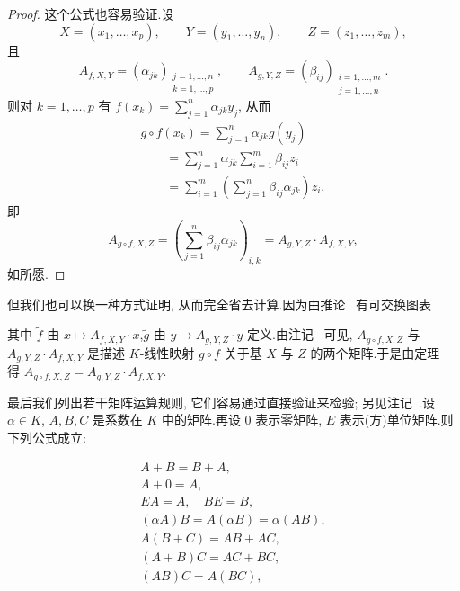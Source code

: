 \begin{proof}
这个公式也容易验证.设
\[
X = (x_1, \ldots, x_p), \qquad Y = (y_1, \ldots, y_n), \qquad Z = (z_1, \ldots, z_m),
\]
且
\[
A_{f, X, Y} = (\alpha_{jk})_{\substack{j = 1, \ldots, n\\ k = 1, \ldots, p}}, \qquad
A_{g, Y, Z} = (\beta_{ij})_{\substack{i = 1, \ldots, m\\ j = 1, \ldots, n}}\text{.}
\]
则对 $k = 1, \ldots, p$ 有 $f(x_k) = \sum_{j = 1}^{n}\alpha_{jk}y_j$, 从而
\[
\begin{array}{l}
g \circ f(x_k) = \sum_{j = 1}^{n}\alpha_{jk}g(y_j) \\
\qquad = \sum_{j = 1}^{n}\alpha_{jk}\sum_{i = 1}^{m}\beta_{ij}z_i \\
\qquad = \sum_{i = 1}^{m}\left(\sum_{j = 1}^{n}\beta_{ij}\alpha_{jk}\right)z_i,
\end{array}
\]
即
\[
A_{g \circ f, X, Z} = \left(\sum_{j = 1}^{n}\beta_{ij}\alpha_{jk}\right)_{i, k} = A_{g, Y, Z} \cdot A_{f, X, Y},
\]
如所愿.
\end{proof}

但我们也可以换一种方式证明, 从而完全省去计算.因为由推论~ 有可交换图表

\begin{center}
\end{center}

其中 $\tilde{f}$ 由 $x \longmapsto A_{f, X, Y} \cdot x$,$\tilde{g}$ 由 $y \longmapsto A_{g, Y, Z} \cdot y$ 定义.由注记~ 可见, $A_{g \circ f, X, Z}$ 与 $A_{g, Y, Z} \cdot A_{f, X, Y}$ 是描述 $K$-线性映射 $g \circ f$ 关于基 $X$ 与 $Z$ 的两个矩阵.于是由定理~ 得 $A_{g \circ f, X, Z} = A_{g, Y, Z} \cdot A_{f, X, Y}$.

最后我们列出若干矩阵运算规则, 它们容易通过直接验证来检验; 另见注记~.设 $\alpha \in K$, $A, B, C$ 是系数在 $K$ 中的矩阵.再设 $0$ 表示零矩阵, $E$ 表示(方)单位矩阵.则下列公式成立:

\[
\begin{array}{c}
A + B = B + A, \\
A + 0 = A, \\
EA = A, \quad BE = B, \\
(\alpha A)B = A(\alpha B) = \alpha(AB), \\
A(B + C) = AB + AC, \\
(A + B)C = AC + BC, \\
(AB)C = A(BC),
\end{array}
\]

